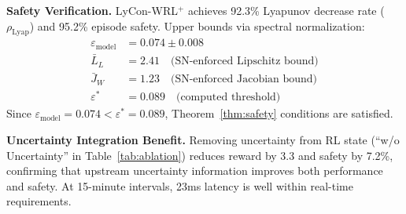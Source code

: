 \documentclass{article}
\theoremstyle{plain}
\theoremstyle{definition}
\theoremstyle{remark}
\begin{document}
\begin{table}[t]
\centering
\caption{RL results (mean ± 95\% CI, 10 seeds). Safety = \% episodes with zero violations.}
\label{tab:rl}
\end{table}

\textbf{Safety Verification.} LyCon-WRL$^+$ achieves 92.3\% Lyapunov decrease rate ($\rho_{\text{Lyap}}$) and 95.2\% episode safety. Upper bounds via spectral normalization:
\begin{align*}
\varepsilon_{\text{model}} &= 0.074 \pm 0.008 \\
\bar{L}_L &= 2.41 \quad \text{(SN-enforced Lipschitz bound)} \\
\bar{J}_W &= 1.23 \quad \text{(SN-enforced Jacobian bound)} \\
\varepsilon^* &= 0.089 \quad \text{(computed threshold)}
\end{align*}
Since $\varepsilon_{\text{model}} = 0.074 < \varepsilon^* = 0.089$, Theorem~\ref{thm:safety} conditions are satisfied.

\textbf{Uncertainty Integration Benefit.} Removing uncertainty from RL state (``w/o Uncertainty'' in Table~\ref{tab:ablation}) reduces reward by 3.3 and safety by 7.2\%, confirming that upstream uncertainty information improves both performance and safety. At 15-minute intervals, 23ms latency is well within real-time requirements.
\end{document}
